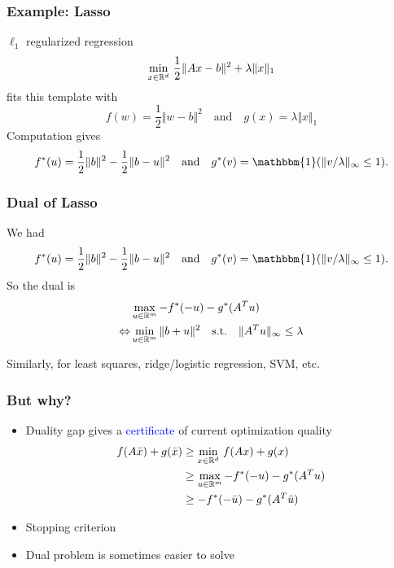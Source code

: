 \documentclass[aspectratio=149]{beamer}
\begin{document}
\begin{frame}
  \frametitle{Example: Lasso}
  $\ell_1$ regularized regression
  \begin{equation}
    \min_{x\in \mathbb{R}^d}\, \frac12 \Vert Ax-b \Vert^2 + \lambda \Vert x \Vert_1
  \end{equation}
  fits this template with
  \begin{equation}
    f(w) = \frac12 \Vert w-b \Vert^2 \quad \text{and} \quad g(x) = \lambda \Vert x \Vert_1
  \end{equation}
  Computation gives
  \begin{equation}
    f^*(u) = \frac12 \Vert b \Vert^2 - \frac12 \Vert b-u \Vert^2 \quad \text{and} \quad g^*(v)= \mathbbm{1}(\Vert v/\lambda \Vert_\infty \le 1).
  \end{equation}
\end{frame}

\begin{frame}
  \frametitle{Dual of Lasso}
  We had
  \begin{equation}
    f^*(u) = \frac12 \Vert b \Vert^2 - \frac12 \Vert b-u \Vert^2 \quad \text{and} \quad g^*(v)= \mathbbm{1}(\Vert v/\lambda \Vert_\infty \le 1).
  \end{equation}
  So the dual is
  \begin{equation}
    \begin{aligned}
      &\max_{u\in \mathbb{R}^m} - f^*(-u) - g^*(A^T u) \\
      \Leftrightarrow& \min_{u\in\mathbb{R}^m} \Vert b+u \Vert^2 \quad \text{s.t.} \quad \Vert A^T u \Vert_{\infty} \le \lambda
    \end{aligned}
  \end{equation}

  Similarly, for least squares, ridge/logistic regression, SVM, etc.
\end{frame}

\begin{frame}
  \frametitle{But why?}
  \begin{itemize}
    \item Duality gap gives a \textcolor{blue}{certificate} of current optimization quality
          \begin{equation}
            \begin{aligned}
              f(A \bar{x}) + g(\bar{x}) &\ge \min_{x\in\mathbb{R}^d} \, f(Ax) + g(x) \\
              & \ge \max_{u\in\mathbb{R}^m} - f^*(-u) - g^*(A^T u) \\
              &\ge -f^*(-\bar{u}) - g^*(A^T \bar{u})
            \end{aligned}
          \end{equation}
    \item Stopping criterion
    \item Dual problem is sometimes easier to solve
  \end{itemize}
\end{frame}
\end{document}

